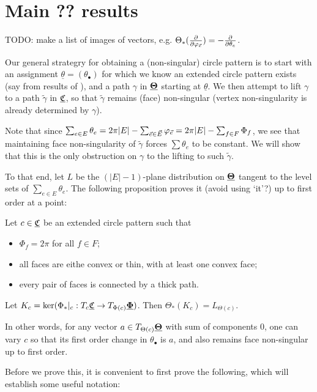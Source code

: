 \section{Main ?? results}


TODO: make a list of images of vectors, e.g.
$\Theta_*({\frac{\partial}{\partial \varphi_{\vec{e}}}}) = -{\frac{\partial}{\partial \theta_e}}$.


Our general strategry for obtaining a (non-singular) circle pattern
is to start with an assignment $\underline{\theta} = (\theta_\bullet)$
for which we know an extended circle pattern exists
(say from results of ),
and a path $\gamma$ in ${\underline{\mathbf{\Theta}}}$ starting at $\underline{\theta}$.
We then attempt to lift $\gamma$ to a path $\tilde{\gamma}$ in ${\underline{\mathfrak{C}}}$,
so that $\tilde{\gamma}$ remains (face) non-singular
(vertex non-singularity is already determined by $\gamma$).

Note that since $\sum_{e\in E} \theta_e
= 2\pi |E| - \sum_{\vec{e} \in \vec{E}} \varphi_{\vec{e}}
= 2\pi |E| - \sum_{f\in F} \Phi_f$,
we see that maintaining face non-singularity of $\tilde{\gamma}$
forces $\sum \theta_e$ to be constant.
We will show that this is the only obstruction on $\gamma$
to the lifting to such $\tilde{\gamma}$.

To that end, let $L$ be the $(|E|-1)$-plane distribution on ${\underline{\mathbf{\Theta}}}$
tangent to the level sets of $\sum_{e\in E} \theta_e$.
The following proposition proves it (avoid using `it'?) up to first order at a point:


\begin{proposition}
\label{p:point_lift}
Let $c \in {\underline{\mathfrak{C}}}$ be an extended circle pattern such that
\begin{itemize}
	\item $\Phi_f = 2\pi$ for all $f\in F$;
	\item all faces are eithe convex or thin,
		with at least one convex face;
	\item every pair of faces is connected by a thick path.
\end{itemize}
Let $K_c = \ker (\Phi_*|_c : T_c {\underline{\mathfrak{C}}} \to T_{\Phi(c)} {\underline{\mathbf{\Phi}}})$.
Then $\Theta_*(K_c) = L_{\Theta(c)}$.

In other words, for any vector $a \in T_{\Theta(c)} {\underline{\mathbf{\Theta}}}$
with sum of components 0, one can vary $c$ so that its
first order change in $\theta_\bullet$ is $a$,
and also remains face non-singular up to first order.
\end{proposition}


Before we prove this, it is convenient to first prove the following,
which will establish some useful notation:

